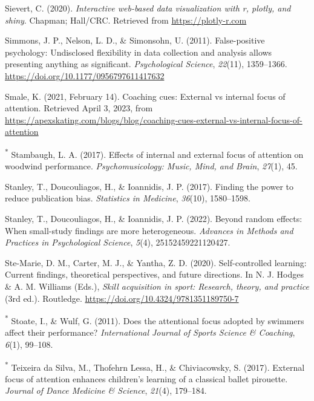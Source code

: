 \documentclass[
  man, donotrepeattitle,floatsintext]{apa7}
\newlength{\cslhangindent}
\newlength{\cslentryspacingunit} %
\newenvironment{CSLReferences}[2] %
 {%
  \setlength{\parindent}{0pt}
  \ifodd #1
  \let\oldpar\par
  \def\par{\hangindent=\cslhangindent\oldpar}
  \fi
  \setlength{\parskip}{#2\cslentryspacingunit}
 }%
 {}
\begin{document}
\begin{CSLReferences}{1}{0}
\leavevmode{}%
Sievert, C. (2020). \emph{Interactive web-based data visualization with r, plotly, and shiny}. Chapman; Hall/CRC. Retrieved from \url{https://plotly-r.com}

\leavevmode{}%
Simmons, J. P., Nelson, L. D., \& Simonsohn, U. (2011). False-positive psychology: {Undisclosed} flexibility in data collection and analysis allows presenting anything as significant. \emph{Psychological Science}, \emph{22}(11), 1359--1366. \url{https://doi.org/10.1177/0956797611417632}

\leavevmode{}%
Smale, K. (2021, February 14). Coaching cues: {External} vs internal focus of attention. Retrieved April 3, 2023, from \url{https://apexskating.com/blogs/blog/coaching-cues-external-vs-internal-focus-of-attention}

\leavevmode{}%
\textsuperscript{*} Stambaugh, L. A. (2017). Effects of internal and external focus of attention on woodwind performance. \emph{Psychomusicology: Music, Mind, and Brain}, \emph{27}(1), 45.

\leavevmode{}%
Stanley, T., Doucouliagos, H., \& Ioannidis, J. P. (2017). Finding the power to reduce publication bias. \emph{Statistics in Medicine}, \emph{36}(10), 1580--1598.

\leavevmode{}%
Stanley, T., Doucouliagos, H., \& Ioannidis, J. P. (2022). Beyond random effects: When small-study findings are more heterogeneous. \emph{Advances in Methods and Practices in Psychological Science}, \emph{5}(4), 25152459221120427.

\leavevmode{}%
Ste-Marie, D. M., Carter, M. J., \& Yantha, Z. D. (2020). Self-controlled learning: {Current} findings, theoretical perspectives, and future directions. In N. J. Hodges \& A. M. Williams (Eds.), \emph{Skill acquisition in sport: {Research}, theory, and practice} (3rd ed.). Routledge. \url{https://doi.org/10.4324/9781351189750-7}

\leavevmode{}%
\textsuperscript{*} Stoate, I., \& Wulf, G. (2011). Does the attentional focus adopted by swimmers affect their performance? \emph{International Journal of Sports Science \& Coaching}, \emph{6}(1), 99--108.

\leavevmode{}%
\textsuperscript{*} Teixeira da Silva, M., Thofehrn Lessa, H., \& Chiviacowsky, S. (2017). External focus of attention enhances children's learning of a classical ballet pirouette. \emph{Journal of Dance Medicine \& Science}, \emph{21}(4), 179--184.


\end{CSLReferences}
\end{document}
